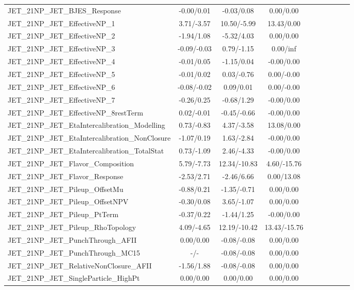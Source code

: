 \begin{table}[h]
\begin{center}
\begin{tabular}{l|ccccccccc}
JET\_21NP\_JET\_BJES\_Response &-0.00/0.01 &-0.03/0.08 &0.00/0.00 \\
JET\_21NP\_JET\_EffectiveNP\_1 &3.71/-3.57 &10.50/-5.99 &13.43/0.00 \\
JET\_21NP\_JET\_EffectiveNP\_2 &-1.94/1.08 &-5.32/4.03 &0.00/0.00 \\
JET\_21NP\_JET\_EffectiveNP\_3 &-0.09/-0.03 &0.79/-1.15 &0.00/inf \\
JET\_21NP\_JET\_EffectiveNP\_4 &-0.01/0.05 &-1.15/0.04 &-0.00/0.00 \\
JET\_21NP\_JET\_EffectiveNP\_5 &-0.01/0.02 &0.03/-0.76 &0.00/-0.00 \\
JET\_21NP\_JET\_EffectiveNP\_6 &-0.08/-0.02 &0.09/0.01 &0.00/-0.00 \\
JET\_21NP\_JET\_EffectiveNP\_7 &-0.26/0.25 &-0.68/1.29 &-0.00/0.00 \\
JET\_21NP\_JET\_EffectiveNP\_8restTerm &0.02/-0.01 &-0.45/-0.66 &-0.00/0.00 \\
JET\_21NP\_JET\_EtaIntercalibration\_Modelling &0.73/-0.83 &4.37/-3.58 &13.08/0.00 \\
JET\_21NP\_JET\_EtaIntercalibration\_NonClosure &-1.07/0.19 &1.63/-2.84 &-0.00/0.00 \\
JET\_21NP\_JET\_EtaIntercalibration\_TotalStat &0.73/-1.09 &2.46/-4.33 &-0.00/0.00 \\
JET\_21NP\_JET\_Flavor\_Composition &5.79/-7.73 &12.34/-10.83 &4.60/-15.76 \\
JET\_21NP\_JET\_Flavor\_Response &-2.53/2.71 &-2.46/6.66 &0.00/13.08 \\
JET\_21NP\_JET\_Pileup\_OffsetMu &-0.88/0.21 &-1.35/-0.71 &0.00/0.00 \\
JET\_21NP\_JET\_Pileup\_OffsetNPV &-0.30/0.08 &3.65/-1.07 &0.00/0.00 \\
JET\_21NP\_JET\_Pileup\_PtTerm &-0.37/0.22 &-1.44/1.25 &-0.00/0.00 \\
JET\_21NP\_JET\_Pileup\_RhoTopology &4.09/-4.65 &12.19/-10.42 &13.43/-15.76 \\
JET\_21NP\_JET\_PunchThrough\_AFII &0.00/0.00 &-0.08/-0.08 &0.00/0.00 \\
JET\_21NP\_JET\_PunchThrough\_MC15 &-/- &-0.08/-0.08 &0.00/0.00 \\
JET\_21NP\_JET\_RelativeNonClosure\_AFII &-1.56/1.88 &-0.08/-0.08 &0.00/0.00 \\
JET\_21NP\_JET\_SingleParticle\_HighPt &0.00/0.00 &0.00/0.00 &0.00/0.00 \\
\hline
\end{tabular}
\end{center}
\end{table}
